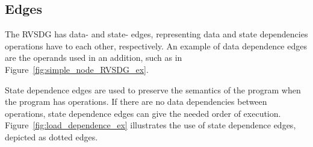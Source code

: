\subsection{Edges}

The RVSDG has data- and state- edges, representing data and state dependencies
operations have to each other, respectively. An example of data dependence edges
are the operands used in an addition, such as in
Figure~\ref{fig:simple_node_RVSDG_ex}.

State dependence edges are used to preserve the semantics of the program when
the program has  operations. If there are no data dependencies
between operations, state dependence edges can give the needed order of
execution. Figure~\ref{fig:load_dependence_ex} illustrates the use of state
dependence edges, depicted as dotted edges.

